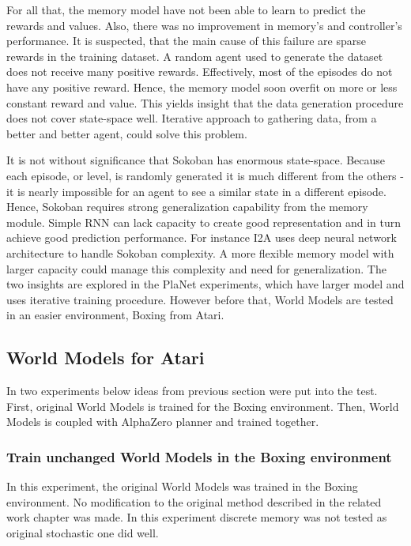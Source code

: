 For all that, the memory model have not been able to learn to predict the rewards and values. Also, there was no improvement in memory's and controller’s performance. It is suspected, that the main cause of this failure are sparse rewards in the training dataset. A random agent used to generate the dataset does not receive many positive rewards. Effectively, most of the episodes do not have any positive reward. Hence, the memory model soon overfit on more or less constant reward and value. 
This yields insight that the data generation procedure does not cover state-space well. Iterative approach to gathering data, from a better and better agent, could solve this problem.

It is not without significance that Sokoban has enormous state-space. Because each episode, or level, is randomly generated it is much different from the others - it is nearly impossible for an agent to see a similar state in a different episode. Hence, Sokoban requires strong generalization capability from the memory module. Simple RNN can lack capacity to create good representation and in turn achieve good prediction performance. For instance I2A\cite{Algo.I2A} uses deep neural network architecture to handle Sokoban complexity. A more flexible memory model with larger capacity could manage this complexity and need for generalization. The two insights are explored in the PlaNet experiments, which have larger model and uses iterative training procedure. However before that, World Models are tested in an easier environment, Boxing from Atari.

\subsection{World Models for Atari}

In two experiments below ideas from previous section were put into the test. First, original World Models is trained for the Boxing environment. Then, World Models is coupled with AlphaZero planner and trained together.

\subsubsection{Train unchanged World Models in the Boxing environment}

In this experiment, the original World Models was trained in the Boxing environment. No modification to the original method described in the related work chapter was made. In this experiment discrete memory was not tested as original stochastic one did well.

